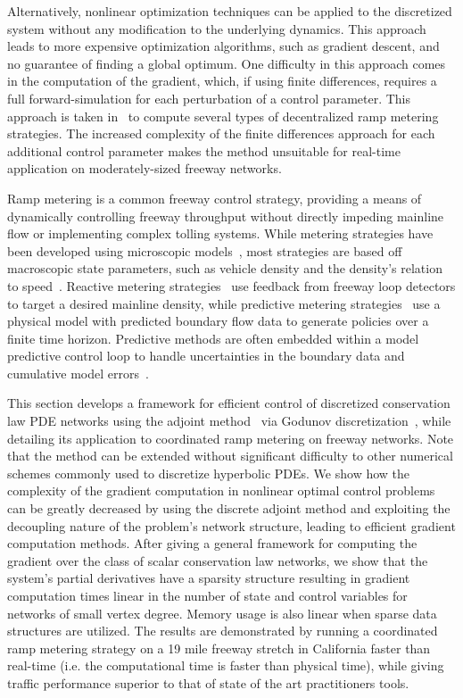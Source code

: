 Alternatively, nonlinear optimization techniques can be applied to the 
discretized system without any modification to the underlying dynamics. This 
approach leads to more expensive optimization algorithms, such as gradient 
descent, and no guarantee of finding a global optimum. One difficulty in this 
approach comes in the computation of the gradient, which, if using finite 
differences, requires a full forward-simulation for each perturbation of a 
control parameter. This approach is taken in~\cite{Ramon2013,Frejo2011} to 
compute several types of decentralized ramp metering strategies. The increased 
complexity of the finite differences approach for each additional control 
parameter makes the method unsuitable for real-time application on 
moderately-sized freeway networks.


Ramp metering is a common freeway control strategy, providing a means of 
dynamically controlling freeway throughput without directly impeding mainline 
flow or implementing complex tolling systems. While metering strategies have 
been developed using microscopic models~\cite{Ben-Akiva2003}, most strategies 
are based off macroscopic state parameters, such as vehicle density and the 
density's relation to 
speed~\cite{richards1956shock,lighthill1955kinematic,daganzo1995cell}. Reactive 
metering strategies~\cite{Papageorgiou1991,Papamichail,Kachroo2003} use 
feedback from freeway loop detectors to target a desired mainline density, 
while predictive metering 
strategies~\cite{Frejo2011,Kotsialos2004,gomes2006optimal,Chen1997} use a 
physical model with predicted boundary flow data to generate policies over a 
finite time horizon. Predictive methods are often embedded within a model 
predictive control loop to handle uncertainties in the boundary data and 
cumulative model errors~\cite{Muralidharana}.

This section develops a framework for efficient control of discretized 
conservation law PDE networks using the adjoint 
method~\cite{Giles2000,Pironneau1974} via Godunov 
discretization~\cite{godunov1959}, while detailing its application to 
coordinated ramp metering on freeway networks. Note that the method can be 
extended without significant difficulty to other numerical schemes commonly 
used to discretize hyperbolic PDEs. We show how the complexity of 
the gradient computation in nonlinear optimal control problems can be greatly 
decreased by using the discrete adjoint method and exploiting the decoupling 
nature of the problem's network structure, leading to efficient gradient 
computation methods. After giving a general framework for computing the gradient 
over the class of scalar conservation law networks, we show that the system's 
partial derivatives have a sparsity structure resulting in gradient computation 
times linear in the number of state and control variables for networks of small 
vertex degree. Memory usage is also linear when sparse data structures are utilized. The results are 
demonstrated by running a coordinated ramp metering strategy on a 19 mile 
freeway stretch in California faster than real-time (i.e. the computational time is faster than physical time), while giving traffic performance superior to that of state of the art practitioners tools.

